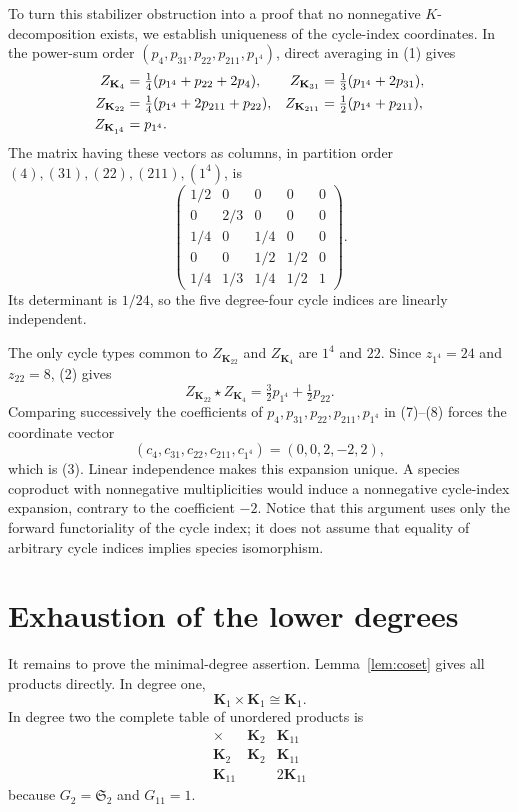 \documentclass[11pt]{article}
\begin{document}
To turn this stabilizer obstruction into a proof that no nonnegative
$K$-decomposition exists, we establish uniqueness of the cycle-index
coordinates.  In the power-sum order
$(p_4,p_{31},p_{22},p_{211},p_{1^4})$, direct averaging in (1) gives
\begin{align}
 Z_{\mathbf{K}_4}&=\tfrac14(p_{1^4}+p_{22}+2p_4),&
 Z_{\mathbf{K}_{31}}&=\tfrac13(p_{1^4}+2p_{31}),\notag\\
 Z_{\mathbf{K}_{22}}&=\tfrac14(p_{1^4}+2p_{211}+p_{22}),&
 Z_{\mathbf{K}_{211}}&=\tfrac12(p_{1^4}+p_{211}),\notag\\
 Z_{\mathbf{K}_{1^4}}&=p_{1^4}. \label{eq:degree-four-indices}
\end{align}
The matrix having these vectors as columns, in partition order
$(4),(31),(22),(211),(1^4)$, is
\[
 \begin{pmatrix}
 1/2&0&0&0&0\\
 0&2/3&0&0&0\\
 1/4&0&1/4&0&0\\
 0&0&1/2&1/2&0\\
 1/4&1/3&1/4&1/2&1
 \end{pmatrix}.
\]
Its determinant is $1/24$, so the five degree-four cycle indices are
linearly independent.

The only cycle types common to $Z_{\mathbf{K}_{22}}$ and $Z_{\mathbf{K}_4}$ are $1^4$ and
$22$.  Since $z_{1^4}=24$ and $z_{22}=8$, (2) gives
\begin{equation}
 Z_{\mathbf{K}_{22}}\star Z_{\mathbf{K}_4}
 =\tfrac32p_{1^4}+\tfrac12p_{22}. \label{eq:target-index}
\end{equation}
Comparing successively the coefficients of
$p_4,p_{31},p_{22},p_{211},p_{1^4}$ in (7)--(8) forces the coordinate vector
\[
 (c_4,c_{31},c_{22},c_{211},c_{1^4})=(0,0,2,-2,2),
\]
which is (3).  Linear independence makes this expansion unique.  A species
coproduct with nonnegative multiplicities would induce a nonnegative
cycle-index expansion, contrary to the coefficient $-2$.  Notice that this
argument uses only the forward functoriality of the cycle index; it does not
assume that equality of arbitrary cycle indices implies species isomorphism.

\section{Exhaustion of the lower degrees}

It remains to prove the minimal-degree assertion.  Lemma~\ref{lem:coset}
gives all products directly.  In degree one,
\[
 \mathbf{K}_1\times\mathbf{K}_1\cong\mathbf{K}_1.
\]
In degree two the complete table of unordered products is
\[
\begin{array}{c|cc}
\times&\mathbf{K}_2&\mathbf{K}_{11}\\ \hline
\mathbf{K}_2&\mathbf{K}_2&\mathbf{K}_{11}\\
\mathbf{K}_{11}&&2\mathbf{K}_{11}
\end{array}
\]
because $G_2=\mathfrak{S}_2$ and $G_{11}=1$.
\end{document}
